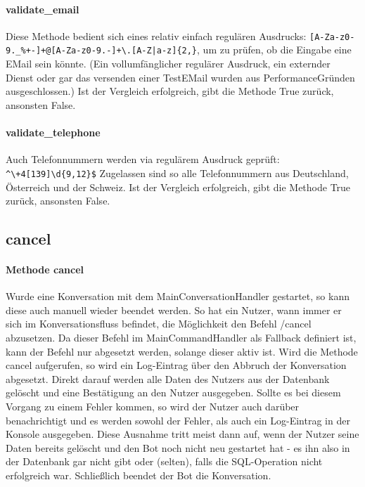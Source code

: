             \paragraph{validate\_email}
                Diese Methode bedient sich eines relativ einfach regulären Ausdrucks: \verb/[A-Za-z0-9._%+-]+@[A-Za-z0-9.-]+\.[A-Z|a-z]{2,}/, um zu prüfen, ob die Eingabe eine E\-Mail sein könnte. (Ein vollumfänglicher regulärer Ausdruck, ein externder Dienst oder gar das versenden einer Test\-E\-Mail wurden aus Performance\-Gründen ausgeschlossen.)
                Ist der Vergleich erfolgreich, gibt die Methode True zurück, ansonsten False.

            \paragraph{validate\_telephone}
                Auch Telefonnummern werden via regulärem Ausdruck geprüft: \verb/^\+4[139]\d{9,12}$/
                Zugelassen sind so alle Telefonnummern aus Deutschland, Österreich und der Schweiz.
                Ist der Vergleich erfolgreich, gibt die Methode True zurück, ansonsten False.

        
        \subsection{cancel}
            \paragraph{Methode cancel}
                Wurde eine Konversation mit dem Main\-ConversationHandler gestartet, so kann diese auch manuell wieder beendet werden. So hat ein Nutzer, wann immer er sich im Konversationsfluss befindet, die Möglichkeit den Befehl /cancel abzusetzen. Da dieser Befehl im Main\-CommandHandler als Fallback definiert ist, kann der Befehl nur abgesetzt werden, solange dieser aktiv ist. Wird die Methode cancel aufgerufen, so wird ein Log-Eintrag über den Abbruch der Konversation abgesetzt. Direkt darauf werden alle Daten des Nutzers aus der Datenbank gelöscht und eine Bestätigung an den Nutzer ausgegeben. Sollte es bei diesem Vorgang zu einem Fehler kommen, so wird der Nutzer auch darüber benachrichtigt und es werden sowohl der Fehler, als auch ein Log-Eintrag in der Konsole ausgegeben. Diese Ausnahme tritt meist dann auf, wenn der Nutzer seine Daten bereits gelöscht und den Bot noch nicht neu gestartet hat - es ihn also in der Datenbank gar nicht gibt oder (selten), falls die SQL-Operation nicht erfolgreich war.
                Schließlich beendet der Bot die Konversation.

